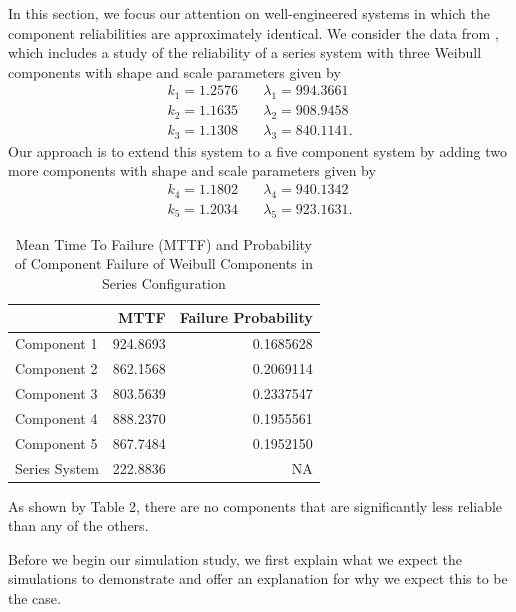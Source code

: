 \documentclass[
]{article}
\begin{document}
In this section, we focus our attention on well-engineered systems in
which the component reliabilities are approximately identical. We
consider the data from \citet{Huairu-2013}, which includes a study of
the reliability of a series system with three Weibull components with
shape and scale parameters given by \begin{equation}
\begin{aligned}
    k_1 = 1.2576 &\quad \lambda_1 = 994.3661\\
    k_2 = 1.1635 &\quad \lambda_2 = 908.9458\\
    k_3 = 1.1308 &\quad \lambda_3 = 840.1141.
\end{aligned}
\end{equation} Our approach is to extend this system to a five component
system by adding two more components with shape and scale parameters
given by \begin{equation}
\begin{aligned}
    k_4 = 1.1802 &\quad \lambda_4 = 940.1342\\
    k_5 = 1.2034 &\quad \lambda_5 = 923.1631.
\end{aligned}
\end{equation}

\begin{table}

\caption{\label{tab:table-2}Mean Time To Failure (MTTF) and Probability of Component Failure of Weibull Components in Series Configuration}
\centering
\begin{tabular}[t]{l|r|r}
\hline
  & MTTF & Failure Probability\\
\hline
Component 1 & 924.8693 & 0.1685628\\
\hline
Component 2 & 862.1568 & 0.2069114\\
\hline
Component 3 & 803.5639 & 0.2337547\\
\hline
Component 4 & 888.2370 & 0.1955561\\
\hline
Component 5 & 867.7484 & 0.1952150\\
\hline
Series System & 222.8836 & NA\\
\hline
\end{tabular}
\end{table}

As shown by Table 2, there are no components that are significantly less
reliable than any of the others.

Before we begin our simulation study, we first explain what we expect
the simulations to demonstrate and offer an explanation for why we
expect this to be the case.
\end{document}
